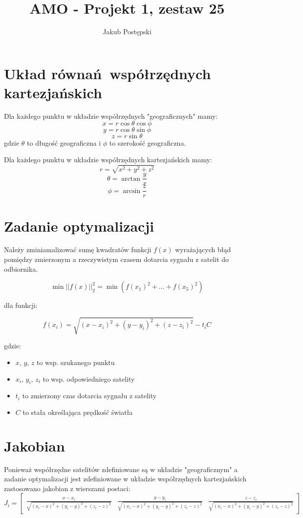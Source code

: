 \documentclass[]{article}
\title{AMO - Projekt 1, zestaw 25}
\author{Jakub Postępski}
\begin{document}
\maketitle


\section{Układ równań współrzędnych kartezjańskich}
Dla każdego punktu w układzie współrzędnych "geograficznych" mamy:
\[ x = r\cos \theta \cos \phi \]
\[ y = r\cos \theta \sin \phi \]
\[ z = r\sin \theta \]
gdzie $ \theta $ to długość geograficzna i $ \phi $ to szerokość geograficzna.

Dla każdego punktu w układzie współrzędnych kartezjańskich mamy:
\[ r = \sqrt{x^2 + y^2 + z^2}\]
\[ \theta = \arctan \frac{y}{x} \]
\[ \phi = \arcsin \frac{z}{r} \]


\section{Zadanie optymalizacji}
Należy zminiamalizować sumę kwadratów funkcji $f(x)$ wyrażających błąd pomiędzy zmierzonym a rzeczywistym czasem dotarcia sygnału z satelit do odbiornika.

\[ \min || f(x) ||^2_2 = \min (f(x_1)^2 + ... + f(x_5)^2)\]

dla funkcji:

\[ f(x_i) = \sqrt{(x-x_i)^2 + (y-y_i)^2 + (z-z_i)^2}-t_iC\]

gdzie:
\begin{itemize}
	\item $x$, $y$, $z$ to wsp. szukanego punktu
	\item $x_i$, $y_i$, $z_i$ to wsp. odpowiedniego satelity
	\item $t_i$ to zmierzony czas dotarcia sygnału z satelity
	\item $C$ to stała określająca prędkość światła
\end{itemize}

\section{Jakobian}
Ponieważ współrzędne satelitów zdefiniowane są w układzie "geograficznym" a zadanie optymalizacji jest zdefiniowane w układzie współrzędnych kartezjańskich zastosowano jakobian z wierszami postaci:
\[J_i = \begin{bmatrix}
	\frac{x - x_i}{\sqrt{(x_i - x)^2 + (y_i - y)^2 + (z_i - z)^2}} &
	\frac{y - y_i}{\sqrt{(x_i - x)^2 + (y_i - y)^2 + (z_i - z)^2}} &
	\frac{z - z_i}{\sqrt{(x_i - x)^2 + (y_i - y)^2 + (z_i - z)^2}}
\end{bmatrix} \]
\end{document}
